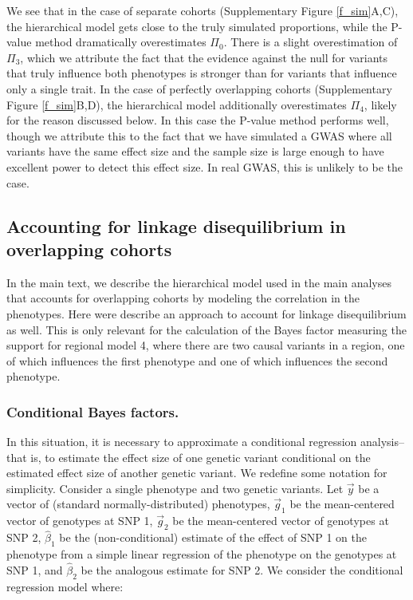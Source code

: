 \documentclass[11pt,titlepage]{article}
\begin{document}
We see that in the case of separate cohorts (Supplementary Figure \ref{f_sim}A,C), the hierarchical model gets close to the truly simulated proportions, while the P-value method dramatically overestimates $\Pi_0$. There is a slight overestimation of $\Pi_3$, which we attribute the fact that the evidence against the null for variants that truly influence both phenotypes is stronger than for variants that influence only a single trait. In the case of perfectly overlapping cohorts (Supplementary Figure \ref{f_sim}B,D), the hierarchical model additionally overestimates $\Pi_4$, likely for the reason discussed below. In this case the P-value method performs well, though we attribute this to the fact that we have simulated a GWAS where all variants have the same effect size and the sample size is large enough to have excellent power to detect this effect size. In real GWAS, this is unlikely to be the case.

\subsection{Accounting for linkage disequilibrium in overlapping cohorts}
In the main text, we describe the hierarchical model used in the main analyses that accounts for overlapping cohorts by modeling the correlation in the phenotypes. Here were describe an approach to account for linkage disequilibrium as well. This is only relevant for the calculation of the Bayes factor measuring the support for regional model 4, where there are two causal variants in a region, one of which influences the first phenotype and one of which influences the second phenotype.

\subsubsection{Conditional Bayes factors.} \label{conditional_bfs}
In this situation, it is necessary to approximate a conditional regression analysis--that is, to estimate the effect size of one genetic variant conditional on the estimated effect size of another genetic variant. We redefine some notation for simplicity. Consider a single phenotype and two genetic variants. Let $\vec y$ be a vector of (standard normally-distributed) phenotypes, $\vec g_{1}$ be the mean-centered vector of genotypes at SNP 1, $\vec g_{2}$ be the mean-centered vector of genotypes at SNP 2, $\hat \beta_1$ be the (non-conditional) estimate of the effect of SNP 1 on the phenotype from a simple linear regression of the phenotype on the genotypes at SNP 1, and $\hat \beta_2$ be the analogous estimate for SNP 2. We consider the conditional regression model where:
\end{document}
